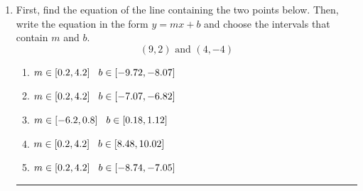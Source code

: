 \documentclass[14pt]{extbook}
\newcommand{\litem}[1]{\item#1\hspace*{-1cm}\rule{\textwidth}{0.4pt}}
\begin{document}
\begin{enumerate}
{\begin{enumerate}[label=\Alph*.]
\end{enumerate} }
\litem{
First, find the equation of the line containing the two points below. Then, write the equation in the form $ y=mx+b $ and choose the intervals that contain $m$ and $b$.\[ (9, 2) \text{ and } (4, -4) \]\begin{enumerate}[label=\Alph*.]
\item \( m \in [0.2, 4.2] \hspace*{3mm} b \in [-9.72, -8.07] \)
\item \( m \in [0.2, 4.2] \hspace*{3mm} b \in [-7.07, -6.82] \)
\item \( m \in [-6.2, 0.8] \hspace*{3mm} b \in [0.18, 1.12] \)
\item \( m \in [0.2, 4.2] \hspace*{3mm} b \in [8.48, 10.02] \)
\item \( m \in [0.2, 4.2] \hspace*{3mm} b \in [-8.74, -7.05] \)

\end{enumerate} }
\end{enumerate}
\end{document}
